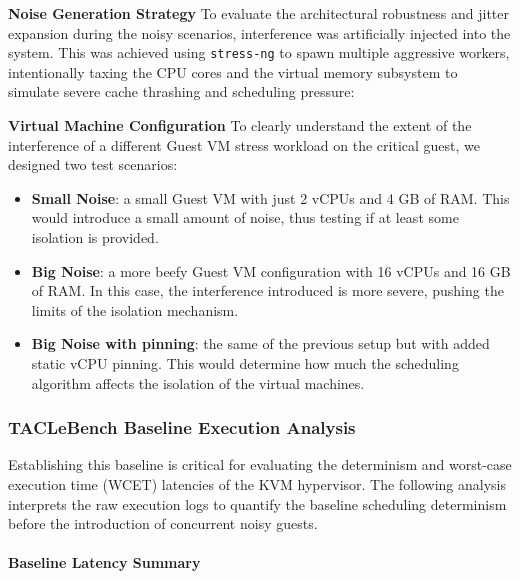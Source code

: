 \textbf{Noise Generation Strategy} To evaluate the architectural
robustness and jitter expansion during the noisy scenarios, interference
was artificially injected into the system. This was achieved using
\texttt{stress-ng} to spawn multiple aggressive workers, intentionally
taxing the CPU cores and the virtual memory subsystem to simulate severe
cache thrashing and scheduling pressure:

\begin{Shaded}
\begin{Highlighting}[]
\end{Highlighting}
\end{Shaded}

\textbf{Virtual Machine Configuration} To clearly understand the extent
of the interference of a different Guest VM stress workload on the
critical guest, we designed two test scenarios:

\begin{itemize}
\item
  \textbf{Small Noise}: a small Guest VM with just 2 vCPUs and 4 GB of
  RAM. This would introduce a small amount of noise, thus testing if at
  least some isolation is provided.
\item
  \textbf{Big Noise}: a more beefy Guest VM configuration with 16 vCPUs
  and 16 GB of RAM. In this case, the interference introduced is more
  severe, pushing the limits of the isolation mechanism.
\item
  \textbf{Big Noise with pinning}: the same of the previous setup but
  with added static vCPU pinning. This would determine how much the
  scheduling algorithm affects the isolation of the virtual machines.
\end{itemize}

\subsubsection{TACLeBench Baseline Execution
Analysis}\label{taclebench-baseline-execution-analysis}

Establishing this baseline is critical for evaluating the determinism
and worst-case execution time (WCET) latencies of the KVM hypervisor.
The following analysis interprets the raw execution logs to quantify the
baseline scheduling determinism before the introduction of concurrent
noisy guests.

\paragraph{Baseline Latency Summary}\label{baseline-latency-summary}

